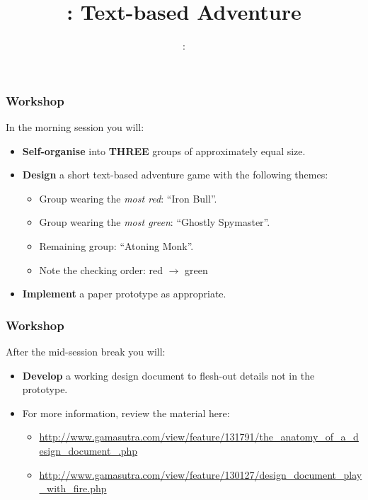 \usepackage{../../beamerthemeFalmouthGamesAcademy}
\usepackage{multimedia}
\graphicspath{ {../../} }


\usepackage[normalem]{ulem}
\usepackage{wasysym}

\usepackage{pdfpages}

\usetikzlibrary{arrows,automata}




\title{\sessionnumber: Text-based Adventure}
\subtitle{\modulecode: \moduletitle}

\frame{\titlepage} 

\begin{frame}
	\frametitle{Workshop}
	In the morning session you will:
	
	\begin{itemize}
		\item \textbf{Self-organise} into \textbf{THREE} groups of approximately equal size.
		\item \textbf{Design} a short text-based adventure game with the following themes:
		\begin{itemize}
			\item Group wearing the \textit{most red}: ``Iron Bull''.
			\item Group wearing the \textit{most green}: ``Ghostly Spymaster''.
			\item Remaining group: ``Atoning Monk''.
			\item Note the checking order: red $\rightarrow$ green
		\end{itemize}
		\item \textbf{Implement} a paper prototype as appropriate.
	\end{itemize}
\end{frame}

\begin{frame}
	\frametitle{Workshop}
	After the mid-session break you will:
	
	\begin{itemize}
		\item \textbf{Develop} a working design document to flesh-out details not in the prototype. 
		\item For more information, review the material here:
		\begin{itemize}
			\item \url{http://www.gamasutra.com/view/feature/131791/the_anatomy_of_a_design_document_.php}
			\item \url{http://www.gamasutra.com/view/feature/130127/design_document_play_with_fire.php}
		\end{itemize}
	\end{itemize}
\end{frame}


